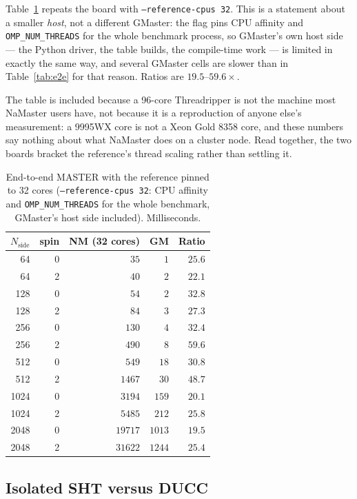 \documentclass[usenatbib,useAMS]{mnras}
\begin{document}
Table~\ref{tab:e2e32} repeats the board with \texttt{--reference-cpus 32}. This is a statement about a smaller \emph{host}, not a different GMaster: the flag pins CPU affinity and \texttt{OMP\_NUM\_THREADS} for the whole benchmark process, so GMaster's own host side --- the Python driver, the table builds, the compile-time work --- is limited in exactly the same way, and several GMaster cells are slower than in Table~\ref{tab:e2e} for that reason. Ratios are $19.5$--$59.6\times$.

The table is included because a 96-core Threadripper is not the machine most NaMaster users have, not because it is a reproduction of anyone else's measurement: a 9995WX core is not a Xeon Gold 8358 core, and these numbers say nothing about what NaMaster does on a cluster node. Read together, the two boards bracket the reference's thread scaling rather than settling it.

\begin{table}
\centering
\setlength{\tabcolsep}{5pt}
\caption{End-to-end MASTER with the reference pinned to 32 cores (\texttt{--reference-cpus 32}: CPU affinity and \texttt{OMP\_NUM\_THREADS} for the whole benchmark, GMaster's host side included). Milliseconds.}
\label{tab:e2e32}
\small
\begin{tabular}{@{}rrrrr@{}}
\toprule
$N_{\mathrm{side}}$ & spin & NM (32 cores) & GM & Ratio \\
\midrule
64   & 0 & $35$    & $1$    & $25.6$ \\
64   & 2 & $40$    & $2$    & $22.1$ \\
128  & 0 & $54$    & $2$    & $32.8$ \\
128  & 2 & $84$    & $3$    & $27.3$ \\
256  & 0 & $130$   & $4$    & $32.4$ \\
256  & 2 & $490$   & $8$    & $59.6$ \\
512  & 0 & $549$   & $18$   & $30.8$ \\
512  & 2 & $1467$  & $30$   & $48.7$ \\
1024 & 0 & $3194$  & $159$  & $20.1$ \\
1024 & 2 & $5485$  & $212$  & $25.8$ \\
2048 & 0 & $19717$ & $1013$ & $19.5$ \\
2048 & 2 & $31622$ & $1244$ & $25.4$ \\
\bottomrule
\end{tabular}
\end{table}

\subsection{Isolated SHT versus DUCC}
\label{sec:sht}
\end{document}
